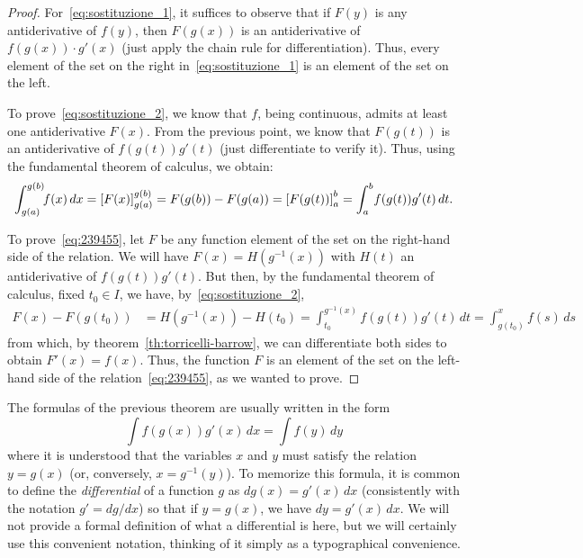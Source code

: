 \begin{proof}
For~\eqref{eq:sostituzione_1}, it suffices to observe that if $F(y)$ is any
antiderivative of $f(y)$, then $F(g(x))$ is an antiderivative of $f(g(x))\cdot
g'(x)$ (just apply the chain rule for differentiation). Thus, every element of
the set on the right in~\eqref{eq:sostituzione_1} is an element of the set on
the left.

To prove~\eqref{eq:sostituzione_2}, we know that $f$, being continuous, admits
at least one antiderivative $F(x)$. From the previous point, we know that
$F(g(t))$ is an antiderivative of $f(g(t))g'(t)$ (just differentiate to verify
it). Thus, using the fundamental theorem of calculus, we obtain:
\[
\int_{g(a)}^{g(b)}\!\! f(x) \, dx
= {\left[ F(x) \right]}_{g(a)}^{g(b)}
= F(g(b)) - F(g(a))
= {\left[ F(g(t)) \right]}_a^b
=\int_a^b\! f(g(t))g'(t)\, dt.
\]

To prove~\eqref{eq:239455}, let $F$ be any function element of the set on the
right-hand side of the relation. We will have $F(x) = H(g^{-1}(x))$ with $H(t)$
an antiderivative of $f(g(t))g'(t)$. But then, by the fundamental theorem of
calculus, fixed $t_0 \in I$, we have, by~\eqref{eq:sostituzione_2},
%
\begin{align*}
  F(x) - F(g(t_0))
  &= H(g^{-1}(x)) - H(t_0)
  = \int_{t_0}^{g^{-1}(x)} f(g(t)) g'(t)\, dt
  = \int_{g(t_0)}^x f(s)\, ds
\end{align*}
from which, by theorem~\ref{th:torricelli-barrow}, we can differentiate both
sides to obtain $F'(x) = f(x)$. Thus, the function $F$ is an element of the set
on the left-hand side of the relation~\eqref{eq:239455}, as we wanted to prove.
\end{proof}

The formulas of the previous theorem are usually written in the form
\[
  \int f(g(x)) g'(x)\, dx = \int f(y) \, dy
\]
where it is understood that the variables $x$ and $y$ must satisfy the relation
$y=g(x)$ (or, conversely, $x=g^{-1}(y)$). To memorize this formula, it is common
to define the \emph{differential} of a function $g$ as $dg(x) = g'(x)\, dx$
(consistently with the notation $g' = dg / dx$) so that if $y=g(x)$, we have $dy
= g'(x)\, dx$. We will not provide a formal definition of what a differential is
here, but we will certainly use this convenient notation, thinking of it simply
as a typographical convenience.

